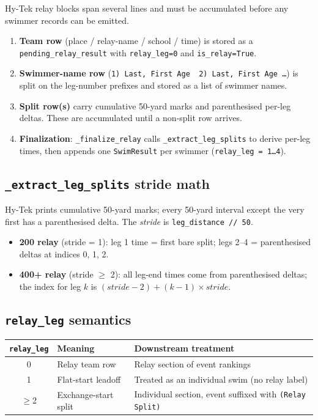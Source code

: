 \documentclass{article}
\begin{document}
Hy-Tek relay blocks span several lines and must be accumulated before any
swimmer records can be emitted.

\begin{enumerate}[noitemsep]
  \item \textbf{Team row} (place / relay-name / school / time) is stored as a
        \texttt{pending\_relay\_result} with \texttt{relay\_leg=0} and
        \texttt{is\_relay=True}.
  \item \textbf{Swimmer-name row} (\texttt{1) Last, First Age\ \ 2) Last,
        First Age \ldots}) is split on the leg-number prefixes and stored as a
        list of swimmer names.
  \item \textbf{Split row(s)} carry cumulative 50-yard marks and
        parenthesised per-leg deltas. These are accumulated until a
        non-split row arrives.
  \item \textbf{Finalization}: \texttt{\_finalize\_relay} calls
        \texttt{\_extract\_leg\_splits} to derive per-leg times, then appends
        one \texttt{SwimResult} per swimmer (\texttt{relay\_leg = 1\ldots4}).
\end{enumerate}

\subsection*{\texttt{\_extract\_leg\_splits} stride math}

Hy-Tek prints cumulative 50-yard marks; every 50-yard interval except the very
first has a parenthesised delta. The \emph{stride} is
\texttt{leg\_distance // 50}.

\begin{itemize}[noitemsep]
  \item \textbf{200 relay} (stride = 1): leg 1 time = first bare split;
        legs 2--4 = parenthesised deltas at indices 0, 1, 2.
  \item \textbf{400+ relay} (stride $\geq$ 2): all leg-end times come from
        parenthesised deltas; the index for leg $k$ is
        $(stride - 2) + (k - 1) \times stride$.
\end{itemize}

\subsection*{\texttt{relay\_leg} semantics}

\begin{center}
\begin{tabular}{@{}cll@{}}
\toprule
\texttt{relay\_leg} & Meaning & Downstream treatment \\
\midrule
0 & Relay team row & Relay section of event rankings \\
1 & Flat-start leadoff & Treated as an individual swim (no relay label) \\
$\geq$2 & Exchange-start split & Individual section, event suffixed with \texttt{(Relay Split)} \\
\bottomrule
\end{tabular}
\end{center}
\end{document}
